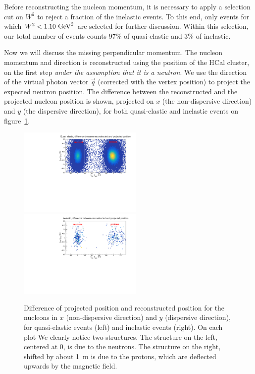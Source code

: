 \documentclass[11pt]{article}
\begin{document}
Before reconstructing the nucleon momentum, it is necessary to apply a selection cut on $W^2$ to reject a fraction of the inelastic events. To this end, only events for which $W^2<1.10~{\rm GeV}^2$ are selected for further discussion. Within this selection, our total number of events counts 97\% of quasi-elastic and 3\% of inelastic.

Now we will discuss the missing perpendicular momentum.
The nucleon momentum and direction is reconstructed using the position of the HCal cluster, on the first step {\em under the assumption that it is a neutron}.
We use the direction of the virtual photon vector $\vec{q}$ (corrected with the vertex position) to project the expected neutron position.
The difference between the reconstructed and the projected nucleon position is shown, projected on $x$ (the non-dispersive direction) and $y$ (the dispersive direction), for both quasi-elastic and inelastic events on figure~\ref{hcal_id_2D}.
%
\begin{figure}[!h]
  \centering
    \includegraphics[width=6cm]{HCal_PID_QE.pdf}
    \includegraphics[width=6cm]{HCal_PID_Inel.pdf}
    \caption{Difference of projected position and reconstructed position for the nucleons in $x$ (non-dispersive direction) and $y$ (dispersive direction), for quasi-elastic events (left) and inelastic events (right). On each plot We clearly notice two structures. The structure on the left, centered at 0, is due to the neutrons. The structure on the right, shifted by about 1~m is due to the protons, which are deflected upwards by the magnetic field. 
    }
    \label{hcal_id_2D}
\end{figure}
\end{document}
